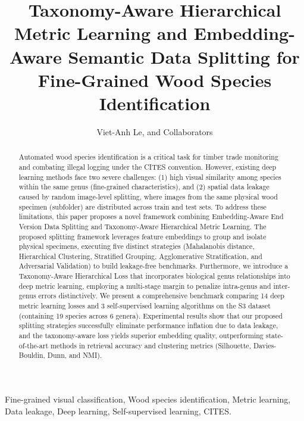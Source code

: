 \documentclass[journal,onecolumn]{IEEEtran}
\begin{document}
\title{Taxonomy-Aware Hierarchical Metric Learning and Embedding-Aware Semantic Data Splitting for Fine-Grained Wood Species Identification}

\author{Viet-Anh Le, and Collaborators}

\maketitle

\begin{abstract}
Automated wood species identification is a critical task for timber trade monitoring and combating illegal logging under the CITES convention. However, existing deep learning methods face two severe challenges: (1) high visual similarity among species within the same genus (fine-grained characteristics), and (2) spatial data leakage caused by random image-level splitting, where images from the same physical wood specimen (subfolder) are distributed across train and test sets. To address these limitations, this paper proposes a novel framework combining Embedding-Aware End Version Data Splitting and Taxonomy-Aware Hierarchical Metric Learning. The proposed splitting framework leverages feature embeddings to group and isolate physical specimens, executing five distinct strategies (Mahalanobis distance, Hierarchical Clustering, Stratified Grouping, Agglomerative Stratification, and Adversarial Validation) to build leakage-free benchmarks. Furthermore, we introduce a Taxonomy-Aware Hierarchical Loss that incorporates biological genus relationships into deep metric learning, employing a multi-stage margin to penalize intra-genus and inter-genus errors distinctively. We present a comprehensive benchmark comparing 14 deep metric learning losses and 3 self-supervised learning algorithms on the S3 dataset (containing 19 species across 6 genera). Experimental results show that our proposed splitting strategies successfully eliminate performance inflation due to data leakage, and the taxonomy-aware loss yields superior embedding quality, outperforming state-of-the-art methods in retrieval accuracy and clustering metrics (Silhouette, Davies-Bouldin, Dunn, and NMI).
\end{abstract}

\begin{IEEEkeywords}
Fine-grained visual classification, Wood species identification, Metric learning, Data leakage, Deep learning, Self-supervised learning, CITES.
\end{IEEEkeywords}
\end{document}
